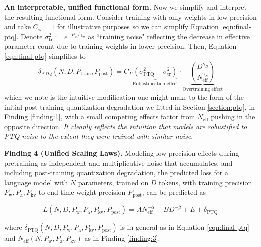 \documentclass[11pt]{article}
\begin{document}
\textbf{An interpretable, unified functional form.} Now we simplify and interpret the resulting functional form. Consider training with only weights in low precision and take $C_\text{w} =1$ for illustrative purposes so we can simplify Equation \ref{eqn:final-ptq}. Denote $\sigma^2_\text{tr} := e^{-P_\text{w}/\gamma_\text{w}}$ as ``training noise" reflecting the decrease in effective parameter count due to training weights in lower precision. Then, Equation \ref{eqn:final-ptq} simplifies to
\begin{equation}
    \delta_\text{PTQ}(N, D, P_\text{train}, P_\text{post}) = C_T 
    \underbrace{(\sigma^2_{\text{PTQ}} - \sigma^2_\text{tr})}_{\text{Robustification effect}} \cdot 
    \underbrace{\left(\frac{D^{\gamma_D}}{N_\text{eff}^{\gamma_N}}\right)}_{\text{Overtraining effect}}
\end{equation}
%
which we note is the intuitive modification one might make to the form of the initial post-training quantization degradation we fitted in Section \ref{section:ptq}, in Finding \ref{finding:1}, with a small competing effects factor from $N_\text{eff}$ pushing in the opposite direction. \textit{It cleanly reflects the intuition that models are robustified to PTQ noise to the extent they were trained with similar noise}. 

\begin{tcolorbox}[colback=lightblue!10, colframe=lightblue!50!black, boxrule=0.5mm, arc=2mm]
    \textbf{Finding 4 (Unified Scaling Laws).} Modeling low-precision effects during pretraining as independent and multiplicative noise that accumulates, and including post-training quantization degradation, the predicted loss for a language model with $N$ parameters, trained on $D$ tokens, with training precision $P_\text{w}, P_\text{a}, P_\text{kv}$ to end-time weight-precision $P_\text{post}$, can be predicted as 

    \begin{equation}
        L(N, D, P_\text{w}, P_\text{a}, P_\text{kv}, P_\text{post}) = AN_\text{eff}^{-\alpha} + BD^{-\beta} + E + \delta_\text{PTQ}
    \end{equation}

    where $\delta_\text{PTQ}(N, D, P_\text{w}, P_\text{a}, P_\text{kv}, P_\text{post})$ is in general as in Equation \ref{eqn:final-ptq} and $N_\text{eff}(N, P_\text{w}, P_\text{a}, P_\text{kv})$ as in Finding \ref{finding:3}.
    
\end{tcolorbox}
\end{document}
